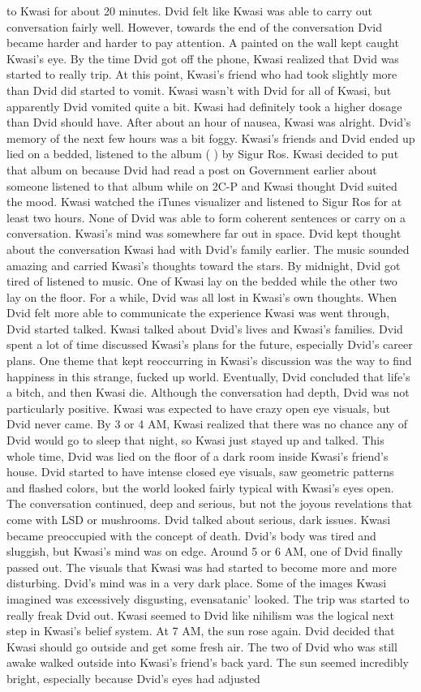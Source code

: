 \documentclass[12pt]{book}
\begin{document}
to Kwasi for about 20 minutes. Dvid felt like Kwasi was able to carry out conversation fairly well. However, towards the end of the conversation Dvid became harder and harder to pay attention. A painted on the wall kept caught Kwasi's eye. By the time Dvid got off the phone, Kwasi realized that Dvid was started to really trip. At this point, Kwasi's friend who had took slightly more than Dvid did started to vomit. Kwasi wasn't with Dvid for all of Kwasi, but apparently Dvid vomited quite a bit. Kwasi had definitely took a higher dosage than Dvid should have. After about an hour of nausea, Kwasi was alright. Dvid's memory of the next few hours was a bit foggy. Kwasi's friends and Dvid ended up lied on a bedded, listened to the album (  ) by Sigur Ros. Kwasi decided to put that album on because Dvid had read a post on Government earlier about someone listened to that album while on 2C-P and Kwasi thought Dvid suited the mood. Kwasi watched the iTunes visualizer and listened to Sigur Ros for at least two hours. None of Dvid was able to form coherent sentences or carry on a conversation. Kwasi's mind was somewhere far out in space. Dvid kept thought about the conversation Kwasi had with Dvid's family earlier. The music sounded amazing and carried Kwasi's thoughts toward the stars. By midnight, Dvid got tired of listened to music. One of Kwasi lay on the bedded while the other two lay on the floor. For a while, Dvid was all lost in Kwasi's own thoughts. When Dvid felt more able to communicate the experience Kwasi was went through, Dvid started talked. Kwasi talked about Dvid's lives and Kwasi's families. Dvid spent a lot of time discussed Kwasi's plans for the future, especially Dvid's career plans. One theme that kept reoccurring in Kwasi's discussion was the way to find happiness in this strange, fucked up world. Eventually, Dvid concluded that life's a bitch, and then Kwasi die. Although the conversation had depth, Dvid was not particularly positive. Kwasi was expected to have crazy open eye visuals, but Dvid never came. By 3 or 4 AM, Kwasi realized that there was no chance any of Dvid would go to sleep that night, so Kwasi just stayed up and talked. This whole time, Dvid was lied on the floor of a dark room inside Kwasi's friend's house. Dvid started to have intense closed eye visuals, saw geometric patterns and flashed colors, but the world looked fairly typical with Kwasi's eyes open. The conversation continued, deep and serious, but not the joyous revelations that come with LSD or mushrooms. Dvid talked about serious, dark issues. Kwasi became preoccupied with the concept of death. Dvid's body was tired and sluggish, but Kwasi's mind was on edge. Around 5 or 6 AM, one of Dvid finally passed out. The visuals that Kwasi was had started to become more and more disturbing. Dvid's mind was in a very dark place. Some of the images Kwasi imagined was excessively disgusting, evensatanic' looked. The trip was started to really freak Dvid out. Kwasi seemed to Dvid like nihilism was the logical next step in Kwasi's belief system. At 7 AM, the sun rose again. Dvid decided that Kwasi should go outside and get some fresh air. The two of Dvid who was still awake walked outside into Kwasi's friend's back yard. The sun seemed incredibly bright, especially because Dvid's eyes had adjusted 
\end{document}
